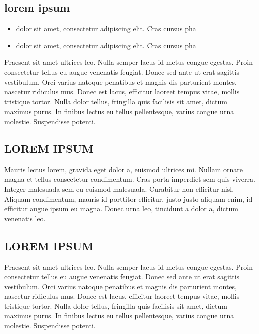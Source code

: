 \documentclass[preprint,12pt]{elsarticle}
\begin{document}
\subsection{lorem ipsum}	

\begin{itemize}

\item  dolor sit amet, consectetur adipiscing elit. Cras cursus pha
\item  dolor sit amet, consectetur adipiscing elit. Cras cursus pha
\end{itemize}
Praesent sit amet ultrices leo. Nulla semper lacus id metus congue egestas. Proin consectetur tellus eu augue venenatis feugiat. Donec sed ante ut erat sagittis vestibulum. Orci varius natoque penatibus et magnis dis parturient montes, nascetur ridiculus mus. Donec est lacus, efficitur laoreet tempus vitae, mollis tristique tortor. Nulla dolor tellus, fringilla quis facilisis sit amet, dictum maximus purus. In finibus lectus eu tellus pellentesque, varius congue urna molestie. Suspendisse potenti.


\subsection{LOREM IPSUM}

Mauris lectus lorem, gravida eget dolor a, euismod ultrices mi. Nullam ornare magna et tellus consectetur condimentum. Cras porta imperdiet sem quis viverra. Integer malesuada sem eu euismod malesuada. Curabitur non efficitur nisl. Aliquam condimentum, mauris id porttitor efficitur, justo justo aliquam enim, id efficitur augue ipsum eu magna. Donec urna leo, tincidunt a dolor a, dictum venenatis leo.



\subsection{LOREM IPSUM}
	
Praesent sit amet ultrices leo. Nulla semper lacus id metus congue egestas. Proin consectetur tellus eu augue venenatis feugiat. Donec sed ante ut erat sagittis vestibulum. Orci varius natoque penatibus et magnis dis parturient montes, nascetur ridiculus mus. Donec est lacus, efficitur laoreet tempus vitae, mollis tristique tortor. Nulla dolor tellus, fringilla quis facilisis sit amet, dictum maximus purus. In finibus lectus eu tellus pellentesque, varius congue urna molestie. Suspendisse potenti.
\end{document}
